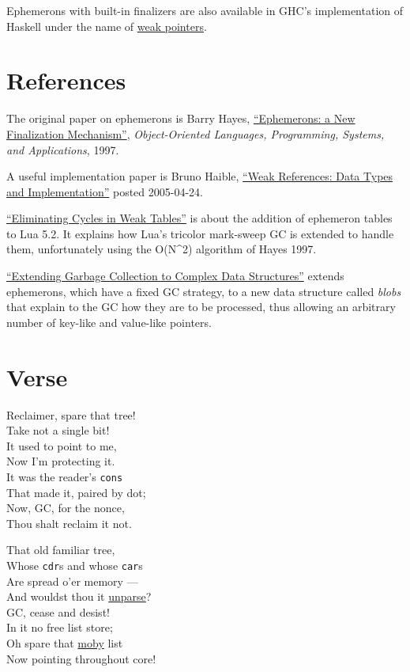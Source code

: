 Ephemerons with built-in finalizers are also available in GHC's
implementation of Haskell under the name of
\href{https://hackage.haskell.org/package/base-4.8.1.0/docs/System-Mem-Weak.html}{weak
pointers}.

\section{References}\label{references}

The original paper on ephemerons is Barry Hayes,
\href{https://static.aminer.org/pdf/PDF/000/522/273/ephemerons_a_new_finalization_mechanism.pdf}{``Ephemerons:
a New Finalization Mechanism''}, \emph{Object-Oriented Languages,
Programming, Systems, and Applications}, 1997.

A useful implementation paper is Bruno Haible,
\href{http://www.haible.de/bruno/papers/cs/weak/WeakDatastructures-writeup.html}{``Weak
References: Data Types and Implementation''} posted 2005-04-24.

\href{http://www.inf.puc-rio.br/~roberto/docs/ry08-06.pdf}{``Eliminating
Cycles in Weak Tables''} is about the addition of ephemeron tables to
Lua 5.2. It explains how Lua's tricolor mark-sweep GC is extended to
handle them, unfortunately using the O(N\^{}2) algorithm of Hayes 1997.

\href{https://www.cs.hmc.edu/~oneill/papers/Blobs-SPACE.pdf}{``Extending
Garbage Collection to Complex Data Structures''} extends ephemerons,
which have a fixed GC strategy, to a new data structure called
\emph{blobs} that explain to the GC how they are to be processed, thus
allowing an arbitrary number of key-like and value-like pointers.

\section{Verse}\label{verse}

Reclaimer, spare that tree!\\
Take not a single bit!\\
It used to point to me,\\
Now I'm protecting it.\\
It was the reader's \texttt{cons}\\
That made it, paired by dot;\\
Now, GC, for the nonce,\\
Thou shalt reclaim it not.

That old familiar tree,\\
Whose \texttt{cdr}s and whose \texttt{car}s\\
Are spread o'er memory ---\\
And wouldst thou it
\href{http://catb.org/jargon/html/P/parse.html}{unparse}?\\
GC, cease and desist!\\
In it no free list store;\\
Oh spare that \href{http://catb.org/jargon/html/M/moby.html}{moby}
list\\
Now pointing throughout core!

